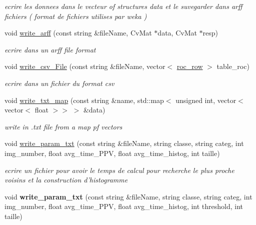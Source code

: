\begin{DoxyCompactItemize}
\begin{DoxyCompactList}\small\item\em ecrire les donnees dans le vecteur of structures data et le suvegarder dans arff fichiers ( format de fichiers utilises par weka ) \end{DoxyCompactList}\item 
\hypertarget{class_fichiers_ab9cd7daf2934b3275a4c48f48c647da1}{
void \hyperlink{class_fichiers_ab9cd7daf2934b3275a4c48f48c647da1}{write\_\-arff} (const string \&fileName, CvMat $\ast$data, CvMat $\ast$resp)}
\label{class_fichiers_ab9cd7daf2934b3275a4c48f48c647da1}

\begin{DoxyCompactList}\small\item\em ecrire dans un arff file format \end{DoxyCompactList}\item 
\hypertarget{class_fichiers_a1d64fb45479951b5d3543a0914ddd144}{
void \hyperlink{class_fichiers_a1d64fb45479951b5d3543a0914ddd144}{write\_\-csv\_\-File} (const string \&fileName, vector$<$ \hyperlink{classroc__row}{roc\_\-row} $>$ table\_\-roc)}
\label{class_fichiers_a1d64fb45479951b5d3543a0914ddd144}

\begin{DoxyCompactList}\small\item\em ecrire dans un fichier du format csv \end{DoxyCompactList}\item 
\hypertarget{class_fichiers_aec83ce272fda4692a59d26481bbaad9b}{
void \hyperlink{class_fichiers_aec83ce272fda4692a59d26481bbaad9b}{write\_\-txt\_\-map} (const string \&name, std::map$<$ unsigned int, vector$<$ vector$<$ float $>$$>$ $>$ \&data)}
\label{class_fichiers_aec83ce272fda4692a59d26481bbaad9b}

\begin{DoxyCompactList}\small\item\em write in .txt file from a map pf vectors \end{DoxyCompactList}\item 
\hypertarget{class_fichiers_ac15eb38bd0d9f79c3a87c65269a43ce9}{
void \hyperlink{class_fichiers_ac15eb38bd0d9f79c3a87c65269a43ce9}{write\_\-param\_\-txt} (const string \&fileName, string classe, string categ, int img\_\-number, float avg\_\-time\_\-PPV, float avg\_\-time\_\-histog, int taille)}
\label{class_fichiers_ac15eb38bd0d9f79c3a87c65269a43ce9}

\begin{DoxyCompactList}\small\item\em ecrire un fichier pour avoir le temps de calcul pour recherche le plus proche voisins et la construction d'histogramme \end{DoxyCompactList}\item 
\hypertarget{class_fichiers_abe814b43bee0c77ebb952a4e959d6a40}{
void {\bfseries write\_\-param\_\-txt} (const string \&fileName, string classe, string categ, int img\_\-number, float avg\_\-time\_\-PPV, float avg\_\-time\_\-histog, int threshold, int taille)}
\label{class_fichiers_abe814b43bee0c77ebb952a4e959d6a40}


\end{DoxyCompactItemize}
